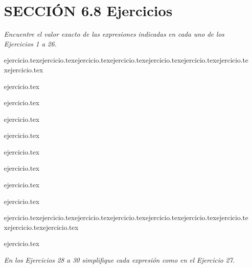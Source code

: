 
\section*{SECCIÓN 6.8 \quad Ejercicios}

\noindent \textit{Encuentre el valor exacto de las expresiones indicadas en cada uno de los Ejercicios 1 a 26.}

\begin{enumerate}
    \begin{minipage}{0.3\textwidth}
    {ejercicio.tex}{ejercicio.tex}{ejercicio.tex}{ejercicio.tex}{ejercicio.tex}{ejercicio.tex}{ejercicio.tex}{ejercicio.tex}\end{minipage}%
    \begin{minipage}{0.3\textwidth}
    \setcounter{enumi}{1}
    {ejercicio.tex}\addtocounter{enumi}{1}
    {ejercicio.tex}\addtocounter{enumi}{1}
    {ejercicio.tex}\addtocounter{enumi}{1}
    {ejercicio.tex}\addtocounter{enumi}{1}
    {ejercicio.tex}\addtocounter{enumi}{1}
    {ejercicio.tex}\addtocounter{enumi}{1}
    {ejercicio.tex}\addtocounter{enumi}{1}
    {ejercicio.tex}\end{minipage}%
    \begin{minipage}{0.3\textwidth}
    \setcounter{enumi}{16}
    {ejercicio.tex}{ejercicio.tex}{ejercicio.tex}{ejercicio.tex}{ejercicio.tex}{ejercicio.tex}{ejercicio.tex}{ejercicio.tex}{ejercicio.tex}\end{minipage}
\end{enumerate}

\begin{enumerate}
    \setcounter{enumi}{26}
    {ejercicio.tex}\end{enumerate}

\noindent \textit{En los Ejercicios 28 a 30 simplifique cada expresión como en el Ejercicio 27.}

